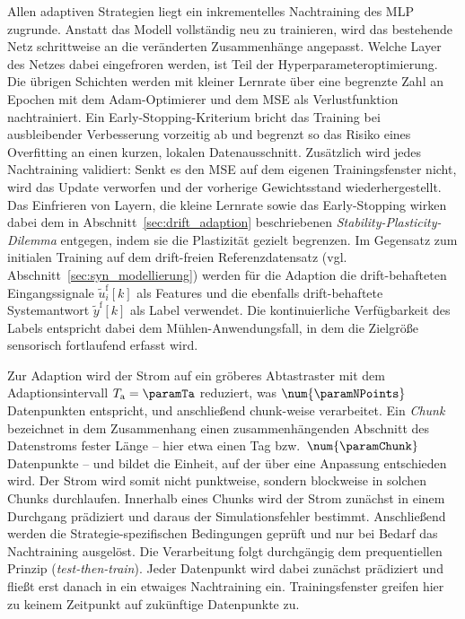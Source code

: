 Allen adaptiven Strategien liegt ein inkrementelles Nachtraining des \ac{MLP} zugrunde. Anstatt das Modell vollständig neu zu trainieren, wird das bestehende Netz schrittweise an die veränderten Zusammenhänge angepasst. Welche Layer des Netzes dabei eingefroren werden, ist Teil der Hyperparameteroptimierung. Die übrigen Schichten werden mit kleiner Lernrate über eine begrenzte Zahl an Epochen mit dem Adam-Optimierer und dem \ac{MSE} als Verlustfunktion nachtrainiert. Ein Early-Stopping-Kriterium bricht das Training bei ausbleibender Verbesserung vorzeitig ab und begrenzt so das Risiko eines Overfitting an einen kurzen, lokalen Datenausschnitt. Zusätzlich wird jedes Nachtraining validiert: Senkt es den \ac{MSE} auf dem eigenen Trainingsfenster nicht, wird das Update verworfen und der vorherige Gewichtsstand wiederhergestellt. Das Einfrieren von Layern, die kleine Lernrate sowie das Early-Stopping wirken dabei dem in Abschnitt~\ref{sec:drift_adaption} beschriebenen \emph{Stability-Plasticity-Dilemma} entgegen, indem sie die Plastizität gezielt begrenzen. Im Gegensatz zum initialen Training auf dem drift-freien Referenzdatensatz (vgl. Abschnitt~\ref{sec:syn_modellierung}) werden für die Adaption die drift-behafteten Eingangssignale $\tilde{u}_i^{\mathrm{f}}[k]$ als Features und die ebenfalls drift-behaftete Systemantwort $\tilde{y}^{\mathrm{f}}[k]$ als Label verwendet. Die kontinuierliche Verfügbarkeit des Labels entspricht dabei dem Mühlen-Anwendungsfall, in dem die Zielgröße sensorisch fortlaufend erfasst wird. \par
%
Zur Adaption wird der Strom auf ein gröberes Abtastraster mit dem Adaptionsintervall $T_{\mathrm{a}} = \paramTa$ reduziert, was $\num{\paramNPoints}$ Datenpunkten entspricht, und anschließend chunk-weise verarbeitet. Ein \emph{Chunk} bezeichnet in dem Zusammenhang einen zusammenhängenden Abschnitt des Datenstroms fester Länge -- hier etwa einen Tag bzw.\ $\num{\paramChunk}$ Datenpunkte -- und bildet die Einheit, auf der über eine Anpassung entschieden wird. Der Strom wird somit nicht punktweise, sondern blockweise in solchen Chunks durchlaufen. Innerhalb eines Chunks wird der Strom zunächst in einem Durchgang prädiziert und daraus der Simulationsfehler bestimmt. Anschließend werden die Strategie-spezifischen Bedingungen geprüft und nur bei Bedarf das Nachtraining ausgelöst. Die Verarbeitung folgt durchgängig dem prequentiellen Prinzip (\emph{test-then-train}). Jeder Datenpunkt wird dabei zunächst prädiziert und fließt erst danach in ein etwaiges Nachtraining ein. Trainingsfenster greifen hier zu keinem Zeitpunkt auf zukünftige Datenpunkte zu. \par
